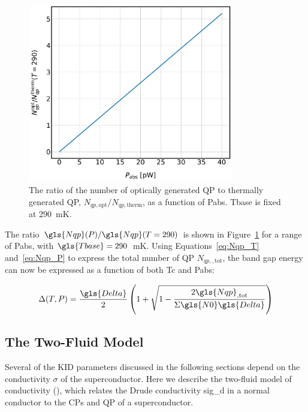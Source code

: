 \begin{figure}[!htbp]
\centering
\includegraphics[width=0.8\textwidth]{figures/kid_model/Nqp_ratio}
\caption[~The ratio of the number of optically generated to thermally generated QP as a function of absorbed optical power.]{The ratio of the number of optically generated QP to thermally generated QP, $N_{qp,\mathrm{opt}}/N_{qp,\mathrm{therm}}$, as a function of \gls{Pabs}. \gls{Tbase} is fixed at 290~mK.}
\label{fig:Nrat}
\end{figure}

The ratio $\gls{Nqp}(P)/\gls{Nqp}(T = 290)$ is shown in Figure~\ref{fig:Nrat} for a range of \gls{Pabs}, with $\gls{Tbase} = 290$~mK. Using Equations~\ref{eq:Nqp_T} and~\ref{eq:Nqp_P} to express the total number of QP $N_{qp,\mathrm{,tot}}$, the band gap energy can now be expressed as a function of both \gls{Tc} and \gls{Pabs}:

\begin{equation}
 \Delta(T,P) = \frac{\gls{Delta}}{2}\left( 1 + \sqrt{1 - \frac{2\gls{Nqp}_{\mathrm{,tot}}} {\Sigma\gls{N0}\gls{Delta}}} \right)
\end{equation}

\subsection{The Two-Fluid Model}\label{two_fluid_model}

Several of the KID parameters discussed in the following sections depend on the conductivity $\sigma$ of the superconductor. Here we describe the two-fluid model of conductivity (\citet{glover1957conductivity,mattis1958theory}), which relates the Drude conductivity \gls{sig_d} in a normal conductor to the CPs and QP of a superconductor.

